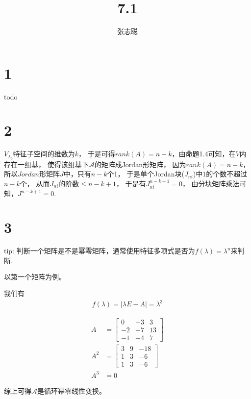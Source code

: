 \documentclass{article}
\begin{document}
\title{7.1}
\author{张志聪}
\maketitle

\section*{1}

todo

\section*{2}

$V_{\lambda_0}$特征子空间的维数为$k$，
于是可得$rank(A) = n - k$，由命题1.4可知，在$V$内存在一组基，
使得该组基下$\mathscr{A}$的矩阵成Jordan形矩阵，
因为$rank(A) = n - k$，所以$Jordan$形矩阵$J$中，只有$n - k$个1，
于是单个Jordan块($J_{ni}$)中$1$的个数不超过$n - k$个，
从而$J_{ni}$的阶数$\leq n - k + 1$，
于是有$J_{ni}^{n - k + 1} = 0$，
由分块矩阵乘法可知，$J^{n - k + 1} = 0$.

\section*{3}

tip:
判断一个矩阵是不是幂零矩阵，通常使用特征多项式是否为$f(\lambda) = \lambda^n$来判断.

以第一个矩阵为例。

我们有
\begin{align*}
  f(\lambda) = |\lambda E - A| = \lambda^3
\end{align*}

\begin{align*}
  A   & = \begin{bmatrix}
            0  & - 3 & 3  \\
            -2 & - 7 & 13 \\
            -1 & - 4 & 7
          \end{bmatrix} \\
  A^2 & = \begin{bmatrix}
            3 & 9 & -18 \\
            1 & 3 & -6  \\
            1 & 3 & -6
          \end{bmatrix} \\
  A^3 & = 0
\end{align*}

综上可得$\mathscr{A}$是循环幂零线性变换。
\end{document}
